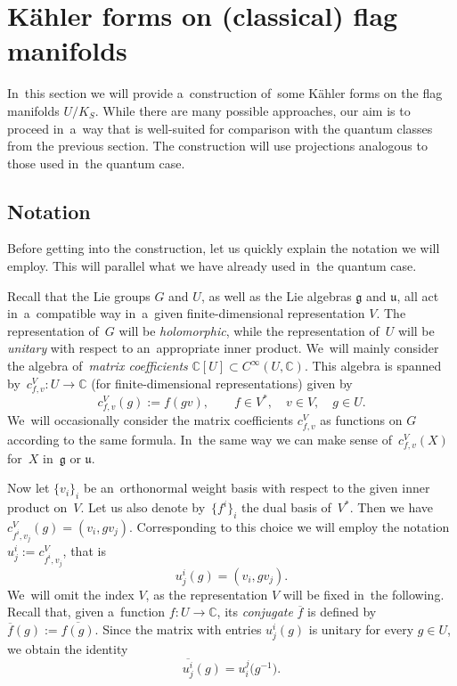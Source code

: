 \documentclass[pdftex]{sigma}
\numberwithin{equation}{section}
\newcommand{\lieg}{\mathfrak{g}}
\newcommand{\lieu}{\mathfrak{u}}
\newcommand{\CU}{\mathbb{C}[U]}
\newcommand{\bbC}{\mathbb{C}}
\begin{document}
\section{K\"ahler forms on (classical) flag manifolds}
\label{sec:kahler-forms}

In~this section we will provide a~construction of~some K\"ahler forms on the flag manifolds $U / K_S$.
While there are many possible approaches, our aim is to proceed in~a~way that is well-suited for comparison with the quantum classes from the previous section.
The construction will use projections analogous to those used in~the quantum case.

\subsection{Notation}

Before getting into the construction, let us quickly explain the notation we will employ.
This will parallel what we have already used in~the quantum case.

Recall that the Lie groups $G$ and $U$, as well as the Lie algebras $\lieg$ and $\lieu$, all act in~a~compatible way in~a~given finite-dimensional representation $V$.
The representation of~$G$ will be \emph{holomorphic}, while the representation of~$U$ will be \emph{unitary} with respect to an~appropriate inner product.
We~will mainly consider the algebra of~\emph{matrix coefficients} $\CU \subset C^\infty(U, \bbC)$.
This algebra is spanned by~$c^V_{f, v}\colon U \to \bbC$ (for finite-dimensional representations) given by
\[
c^V_{f, v}(g) := f(g v), \qquad
f \in V^*, \quad v \in V, \quad g \in U.
\]
We~will occasionally consider the matrix coefficients $c^V_{f, v}$ as functions on $G$ according to the same formula.
In~the same way we can make sense of~$c^V_{f, v}(X)$ for~$X$ in~$\lieg$ or $\lieu$.

Now let $\{v_i\}_i$ be an~orthonormal weight basis with respect to the given inner product on~$V$.
Let us also denote by~$\{f^i\}_i$ the dual basis of~$V^*$. Then we have $c^V_{f^i, v_j}(g) = (v_i, g v_j)$.
Corresponding to this choice we will employ the notation $u^i_j := c^V_{f^i, v_j}$, that is
\[
u^i_j(g) = (v_i, g v_j).
\]
We~will omit the index $V$, as the representation $V$ will be fixed in~the following.
Recall that, given a~function $f\colon U \to \bbC$, its \emph{conjugate} $\overline{f}$ is defined by~$\overline{f}(g) := \overline{f(g)}$.
Since the matrix with entries $u^i_j(g)$ is unitary for every $g \in U$, we obtain the identity
\[
\overline{u^i_j}(g) = u^j_i\big(g^{-1}\big).
\]
\end{document}
